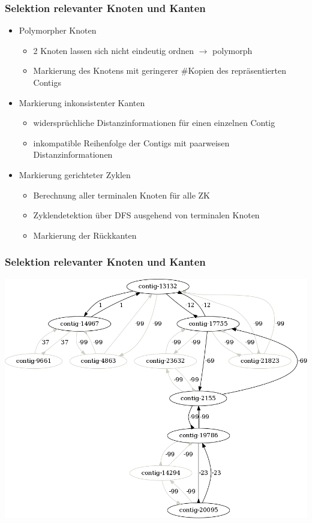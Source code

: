\documentclass[xcolor=pst]{beamer}
\begin{document}
\begin{frame}
  \frametitle{Selektion relevanter Knoten und Kanten}
  \begin{itemize}
    \item Polymorpher Knoten
    \begin{itemize}
      \item 2 Knoten lassen sich nicht eindeutig ordnen $\rightarrow$ polymorph
      \item Markierung des Knotens mit geringerer \#Kopien des repräsentierten Contigs
    \end{itemize}
    \item Markierung inkonsistenter Kanten
    \begin{itemize}
      \item widersprüchliche Distanzinformationen für einen einzelnen Contig
      \item inkompatible Reihenfolge der Contigs mit paarweisen Distanzinformationen
    \end{itemize}
    \item Markierung gerichteter Zyklen
    \begin{itemize}
      \item Berechnung aller terminalen Knoten für alle ZK
      \item Zyklendetektion über DFS ausgehend von terminalen Knoten
      \item Markierung der Rückkanten
    \end{itemize}
  \end{itemize}
\end{frame}

\begin{frame}
  \frametitle{Selektion relevanter Knoten und Kanten}
  \begin{center}
    \includegraphics[scale=0.25]{figures/s_cerevisiae_filter_example_small.png}
  \end{center}
\end{frame}
\end{document}

